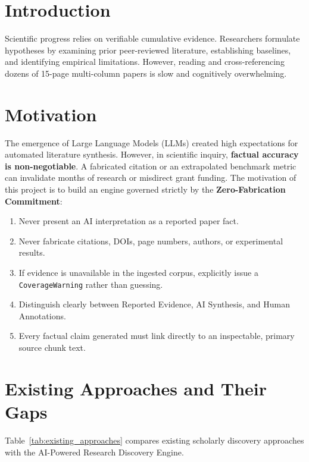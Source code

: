 \documentclass[11pt,a4paper,titlepage]{report}
\begin{document}
\section{Introduction}
Scientific progress relies on verifiable cumulative evidence. Researchers formulate hypotheses by examining prior peer-reviewed literature, establishing baselines, and identifying empirical limitations. However, reading and cross-referencing dozens of 15-page multi-column papers is slow and cognitively overwhelming.

\section{Motivation}
The emergence of Large Language Models (LLMs) created high expectations for automated literature synthesis. However, in scientific inquiry, \textbf{factual accuracy is non-negotiable}. A fabricated citation or an extrapolated benchmark metric can invalidate months of research or misdirect grant funding. The motivation of this project is to build an engine governed strictly by the \textbf{Zero-Fabrication Commitment}:
\begin{enumerate}
    \item Never present an AI interpretation as a reported paper fact.
    \item Never fabricate citations, DOIs, page numbers, authors, or experimental results.
    \item If evidence is unavailable in the ingested corpus, explicitly issue a \texttt{CoverageWarning} rather than guessing.
    \item Distinguish clearly between Reported Evidence, AI Synthesis, and Human Annotations.
    \item Every factual claim generated must link directly to an inspectable, primary source chunk text.
\end{enumerate}

\section{Existing Approaches and Their Gaps}
Table~\ref{tab:existing_approaches} compares existing scholarly discovery approaches with the AI-Powered Research Discovery Engine.
\end{document}

